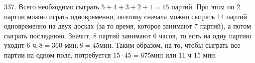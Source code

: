 337. Всего необходимо сыграть $5+4+3+2+1=15$ партий. При этом по 2 партии можно играть одновременно, поэтому сначала можно сыграть 14 партий одновременно на двух досках (за то время, которое занимают 7 партий), а потом сыграть последнюю. Значит, 8 партий занимают 6 часов, то есть на одну партию уходит $6\text{ ч}:8= 360\text{ мин}:8=45$мин. Таким образом, на то, чтобы сыграть все партии на одном поле, потребуется $15\cdot45=675$мин или 11 ч 15 мин.\\
